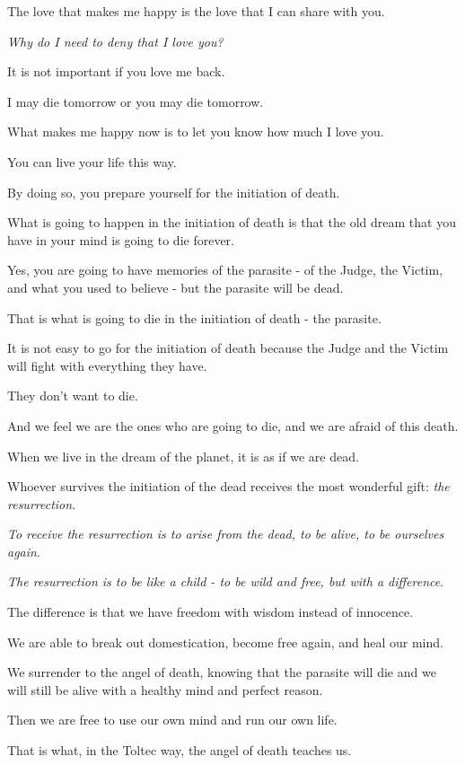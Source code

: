 \documentclass{article}
\numberwithin{equation}{section}
\begin{document}
The love that makes me happy is the love that I can share with you.

\textit{Why do I need to deny that I love you?}

It is not important if you love me back.

I may die tomorrow or you may die tomorrow.

What makes me happy now is to let you know how much I love you.

%
You can live your life this way.

By doing so, you prepare yourself for the initiation of death.

What is going to happen in the initiation of death is that the old dream that you have in your mind is going to die forever.

Yes, you are going to have memories of the parasite - of the Judge, the Victim, and what you used to believe - but the parasite will be dead.

%
That is what is going to die in the initiation of death - the parasite.

It is not easy to go for the initiation of death because the Judge and the Victim will fight with everything they have.

They don't want to die.

And we feel we are the ones who are going to die, and we are afraid of this death.

%
When we live in the dream of the planet, it is as if we are dead.

Whoever survives the initiation of the dead receives the most wonderful gift: \textit{the resurrection}.

\textit{To receive the resurrection is to arise from the dead, to be alive, to be ourselves again}.

\textit{The resurrection is to be like a child - to be wild and free, but with a difference}.

The difference is that we have freedom with wisdom instead of innocence.

We are able to break out domestication, become free again, and heal our mind.

We surrender to the angel of death, knowing that the parasite will die and we will still be alive with a healthy mind and perfect reason.

Then we are free to use our own mind and run our own life.

%
That is what, in the Toltec way, the angel of death teaches us.
\end{document}
